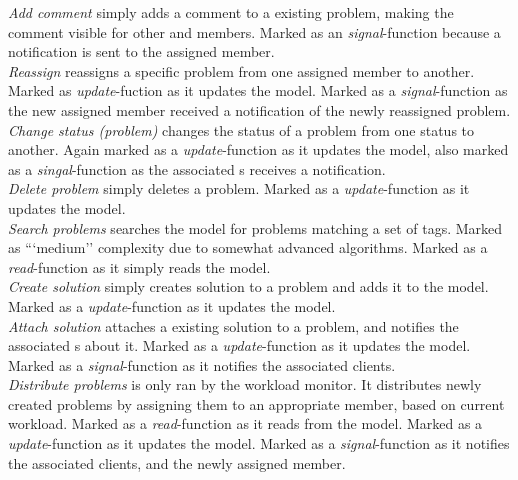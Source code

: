 \emph{Add comment} simply adds a comment to a existing problem, making the comment visible for other \client and \astaff[] members. Marked as an \textit{signal}-function because a notification is sent to the assigned \astaff[] member.  \\

\emph{Reassign} reassigns a specific problem from one assigned \astaff[] member to another. Marked as \textit{update}-fuction as it updates the model. Marked as a \textit{signal}-function as the new assigned \astaff[] member received a notification of the newly reassigned problem. \\

\emph{Change status (problem)} changes the status of a problem from one status to another. Again marked as a \textit{update}-function as it updates the model, also marked as a \textit{singal}-function as the associated \client s receives a notification. \\

\emph{Delete problem} simply deletes a problem. Marked as a \textit{update}-function as it updates the model. \\

\emph{Search problems} searches the model for problems matching a set of tags. Marked as ```medium'' complexity due to somewhat advanced algorithms. Marked as a \textit{read}-function as it simply reads the model.\\

\emph{Create solution} simply creates solution to a problem and adds it to the model. Marked as a \textit{update}-function as it updates the model. \\

\emph{Attach solution} attaches a existing solution to a problem, and notifies the associated \client s about it. Marked as a \textit{update}-function as it updates the model. Marked as a \textit{signal}-function as it notifies the associated clients. \\

\emph{Distribute problems} is only ran by the workload monitor. It distributes newly created problems by assigning them to an appropriate \astaff[] member, based on current workload. %
 Marked as a \textit{read}-function as it reads from the model. Marked as a \textit{update}-function as it updates the model. Marked as a \textit{signal}-function as it notifies the associated clients, and the newly assigned \astaff[] member. \\

